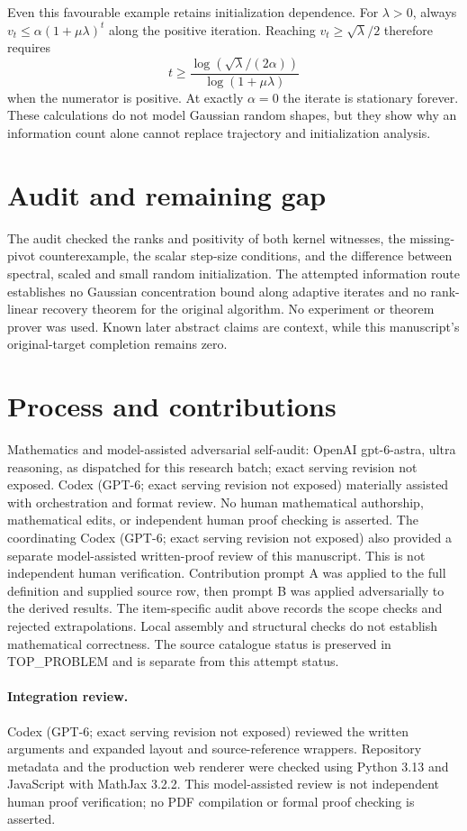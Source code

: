 \documentclass[11pt]{article}
\begin{document}
Even this favourable example retains initialization dependence.
For $\lambda>0$, always
$v_t\le\alpha(1+\mu\lambda)^t$ along the positive iteration.
Reaching $v_t\ge\sqrt\lambda/2$ therefore requires
\[
 t\ge\frac{\log(\sqrt\lambda/(2\alpha))}{\log(1+\mu\lambda)}
\]
when the numerator is positive. At exactly $\alpha=0$ the
iterate is stationary forever. These calculations do not model
Gaussian random shapes, but they show why an information count
alone cannot replace trajectory and initialization analysis.

\section{Audit and remaining gap}
The audit checked the ranks and positivity of both kernel
witnesses, the missing-pivot counterexample, the scalar step-size
conditions, and the difference between spectral, scaled and small
random initialization. The attempted information route establishes
no Gaussian concentration bound along adaptive iterates and no
rank-linear recovery theorem for the original algorithm. No
experiment or theorem prover was used. Known later abstract
claims are context, while this manuscript's original-target
completion remains zero.

\section{Process and contributions}
Mathematics and model-assisted adversarial self-audit: OpenAI gpt-6-astra, ultra reasoning, as dispatched for this research batch; exact serving revision not exposed. Codex (GPT-6; exact serving revision not exposed) materially assisted with orchestration and format review. No human mathematical authorship, mathematical edits, or independent human proof checking is asserted.
The coordinating Codex (GPT-6; exact serving revision not exposed) also provided a separate model-assisted written-proof review of this manuscript. This is not independent human verification.
Contribution prompt A was applied to the full definition and supplied source row, then prompt B was applied adversarially to the derived results. The item-specific audit above records the scope checks and rejected extrapolations. Local assembly and structural checks do not establish mathematical correctness. The source catalogue status is preserved in TOP\_PROBLEM and is separate from this attempt status.
\paragraph{Integration review.} Codex (GPT-6; exact serving revision not exposed) reviewed the written arguments and expanded layout and source-reference wrappers. Repository metadata and the production web renderer were checked using Python 3.13 and JavaScript with MathJax 3.2.2. This model-assisted review is not independent human proof verification; no PDF compilation or formal proof checking is asserted.
\end{document}
